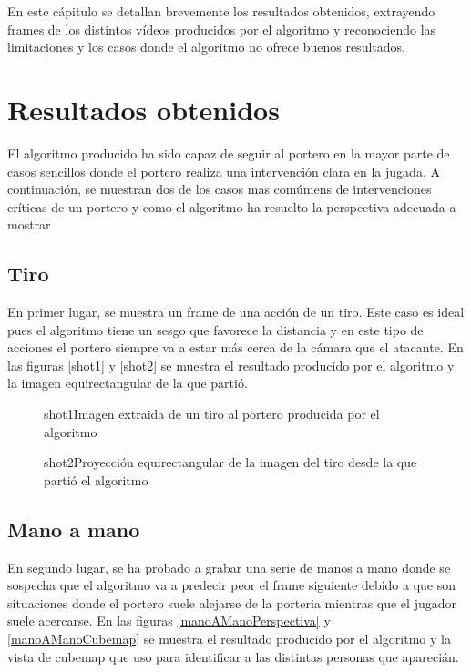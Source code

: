 En este cápitulo se detallan brevemente los resultados obtenidos, extrayendo frames de los distintos vídeos producidos por el algoritmo y reconociendo las limitaciones y los casos donde el algoritmo no ofrece buenos resultados.

\section{Resultados obtenidos}
El algoritmo producido ha sido capaz de seguir al portero en la mayor parte de casos sencillos donde el portero realiza una intervención clara en la jugada. A continuación, se muestran dos de los casos mas comúmens de intervenciones críticas de un portero y como el algoritmo ha resuelto la perspectiva adecuada a mostrar

\subsection{Tiro}
En primer lugar, se muestra un frame de una acción de un tiro. Este caso es ideal pues el algoritmo tiene un sesgo que favorece la distancia y en este tipo de acciones el portero siempre va a estar más cerca de la cámara que el atacante. En las figuras \ref{shot1} y \ref{shot2} se muestra el resultado producido por el algoritmo y la imagen equirectangular de la que partió.

\begin{figure}[Imagen de tiro producida por el algoritmo]{shot1}{Imagen extraida de un tiro al portero producida por el algoritmo}
\end{figure}

\begin{figure}[Proyección equirectangular de la imagen de un tiro]{shot2}{Proyección equirectangular de la imagen del tiro desde la que partió el algoritmo}
\end{figure}

\subsection{Mano a mano}
En segundo lugar, se ha probado a grabar una serie de manos a mano donde se sospecha que el algoritmo va a predecir peor el frame siguiente debido a que son situaciones donde el portero suele alejarse de la porteria mientras que el jugador suele acercarse. En las figuras \ref{manoAManoPerspectiva} y \ref{manoAManoCubemap} se muestra el resultado producido por el algoritmo y la vista de cubemap que uso para identificar a las distintas personas que aparecián.


